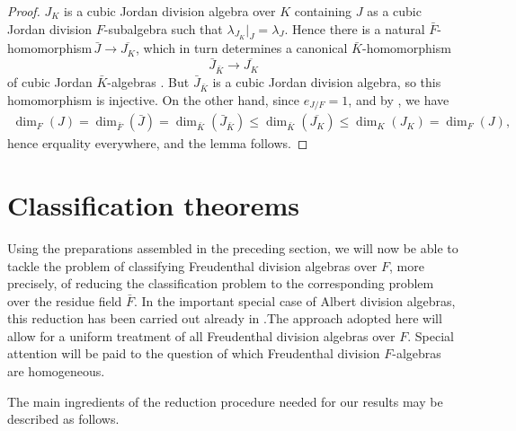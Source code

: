 \documentclass{amsart}
\theoremstyle{definition} %
\theoremstyle{remark} %
\renewcommand{\:}{\colon\,}
\numberwithin{equation}{section}
\begin{document}
\begin{proof}
$J_K$ is a cubic Jordan division algebra over $K$ \cite[Cor.~46.3]{MR4806163} containing $J$ as a cubic Jordan division $F$-subalgebra such that $\lambda_{J_K}\vert_J = \lambda_J$. Hence there is a natural $\bar F$-homomorphism$\, \bar J \to \overline{J_K}$, which in turn determines a canonical $\bar K$-homomorphism
\[
\bar J_{\bar K} \longrightarrow \overline{J_K}
\]	
of cubic Jordan $\bar K$-algebras \cite[Exc.~34.22~(a)]{MR4806163}. But $\bar J_{\bar K}$ is a cubic Jordan division algebra, so this homomorphism is injective. On the other hand, since $e_{J/F} = 1$, and by \cite[5.3]{MR0347922}, we have
\begin{align*}
\dim_F(J) = \dim_{\bar F}(\bar J) = \dim_{\bar K}(\bar J_{\bar K}) \le \dim_{\bar K}(\overline{J_K}) \le \dim_K(J_K) = \dim_F(J),
\end{align*}
hence erquality everywhere, and the lemma follows.
\end{proof}


\section{Classification theorems} \label{s.CLATHE} Using the preparations assembled in the preceding section, we will now be able to tackle the problem of classifying Freudenthal division algebras over $F$, more precisely, of reducing the classification problem to the corresponding problem over the residue field $\bar F$. In the important special case of Albert division algebras, this reduction has been carried out already in \cite{MR0379620}.The approach adopted here will allow for a uniform treatment of all Freudenthal division algebras over $F$. Special attention will be paid to the question of which Freudenthal division $F$-algebras are homogeneous.

The main ingredients of the reduction procedure needed for our results may be described as follows.
\end{document}

